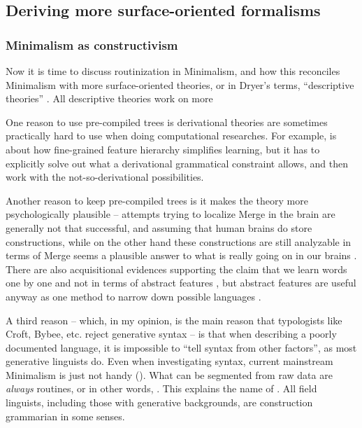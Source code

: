 \documentclass[../main.tex]{subfiles}
\begin{document}

\subsection{Deriving more surface-oriented formalisms}

\subsubsection{Minimalism as constructivism}\label{sec:routine}

Now it is time to discuss routinization in Minimalism, 
and how this reconciles Minimalism with more surface-oriented theories, 
or in Dryer's terms, ``descriptive theories'' \citep{dryer2006descriptive}.
All descriptive theories work on more %

One reason to use pre-compiled trees is derivational theories are sometimes 
practically hard to use when doing computational researches. For example, \citet{liter2020modeling}
is about how fine-grained feature hierarchy simplifies learning, but it has to explicitly solve out what 
a derivational grammatical constraint allows, and then work with the not-so-derivational possibilities.

Another reason to keep pre-compiled trees is it makes the theory more psychologically plausible --
attempts trying to localize Merge in the brain are generally not that successful, and assuming that 
human brains do store constructions, while on the other hand these constructions are still analyzable 
in terms of Merge seems a plausible answer to what is really going on in our brains
\citep{brain-syntax-1,brain-syntax-2}. There are also acquisitional evidences supporting the claim 
that we learn words one by one and not in terms of abstract features \citep{white2022lexicalization},
but abstract features are useful anyway as one method to narrow down possible languages \citep{liter2020modeling}.

A third reason -- which, in my opinion, is the main reason that 
typologists like Croft, Bybee, etc. reject generative syntax -- 
is that when describing a poorly documented language, 
it is impossible to ``tell syntax from other factors'', 
as most generative linguists do.
Even when investigating syntax,
current mainstream Minimalism is just not handy ().
What can be segmented from raw data are \emph{always} routines,
or in other words, .
This explains the name of \citet{croft2001radical}.
All field linguists, including those with generative backgrounds,
are construction grammarian in some senses.
\end{document}
